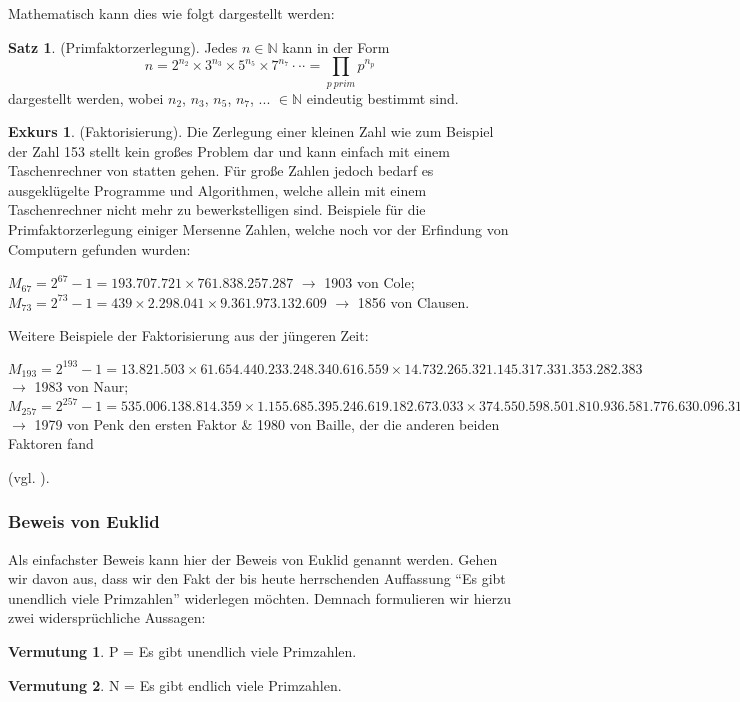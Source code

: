\documentclass[12pt,a4paper]{article}
\theoremstyle{definition}
\newtheorem{satz}{Satz}[subsection]
\newtheorem{vermutung}{Vermutung}[subsection]
\newtheorem{exkurs}{Exkurs}
\begin{document}
Mathematisch kann dies wie folgt dargestellt werden:
\begin{satz}(Primfaktorzerlegung).\newline
Jedes $n \in \mathbb{N}$ kann in der Form
\[n = 2^{n_2} \times 3^{n_3} \times 5^{n_5} \times 7^{n_7} \cdot\cdot\cdot = \prod_{p\ prim} p^{n_p}\]
dargestellt werden, wobei $n_2$, $n_3$, $n_5$, $n_7$, ... $\in \mathbb{N}$ eindeutig bestimmt sind.
\end{satz}

\begin{exkurs}(Faktorisierung).\newline
Die Zerlegung einer kleinen Zahl wie zum Beispiel der Zahl 153 stellt kein großes Problem dar und kann einfach mit einem Taschenrechner von statten gehen.
Für große Zahlen jedoch bedarf es ausgeklügelte Programme und Algorithmen, welche allein mit einem Taschenrechner nicht mehr zu bewerkstelligen sind.\newline
Beispiele für die Primfaktorzerlegung einiger Mersenne Zahlen, welche noch vor der Erfindung von Computern gefunden wurden:
\begin{center}
$M_{67} = 2^{67}-1 = 193.707.721\times761.838.257.287$ $\rightarrow$ 1903 von Cole;\\
$M_{73} = 2^{73}-1 = 439\times2.298.041\times9.361.973.132.609$ $\rightarrow$ 1856 von Clausen.\\
\end{center}
Weitere Beispiele der Faktorisierung aus der jüngeren Zeit:
\begin{center}
$M_{193} = 2^{193}-1 = 13.821.503\times61.654.440.233.248.340.616.559\times14.732.265.321.145.317.331.353.282.383$ $\rightarrow$ 1983 von Naur;\\
$M_{257} = 2^{257}-1 = 535.006.138.814.359\times1.155.685.395.246.619.182.673.033\times374.550.598.501.810.936.581.776.630.096.313.181.393$ $\rightarrow$ 1979 von Penk den ersten Faktor \& 1980 von Baille, der die anderen beiden Faktoren fand\end{center} (vgl. \cite[125--128]{Ribenboim2006}).\end{exkurs}

\subsubsection{Beweis von Euklid}\label{Beweis von Euklid}
Als einfachster Beweis kann hier der Beweis von Euklid genannt werden.
Gehen wir davon aus, dass wir den Fakt der bis heute herrschenden Auffassung “Es gibt unendlich viele Primzahlen” widerlegen möchten.
Demnach formulieren wir hierzu zwei widersprüchliche Aussagen:
\begin{vermutung} P = Es gibt unendlich viele Primzahlen.\end{vermutung}
\begin{vermutung}\label{vermutung} N = Es gibt endlich viele Primzahlen.\end{vermutung}
\end{document}
